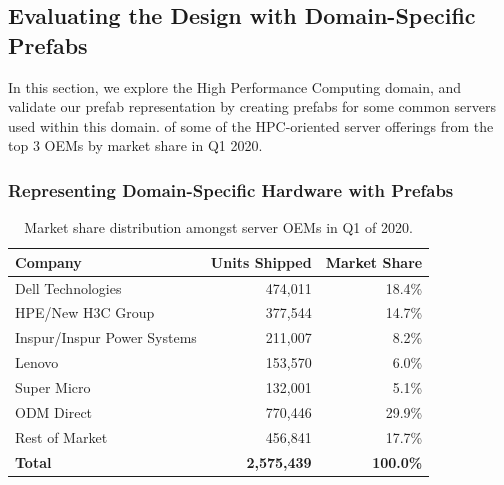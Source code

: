 \documentclass[11pt]{article}
\begin{document}
	\subsection{Evaluating the Design with Domain-Specific Prefabs}
		In this section, we explore the High Performance Computing domain, and validate our prefab representation by creating prefabs for some common servers used within this domain. of some of the HPC-oriented server offerings from the top 3 OEMs by market share in Q1 2020.
	
		\subsubsection{Representing Domain-Specific Hardware with Prefabs}
			\begin{table}[]
			\centering
				\begin{tabular}{lrr}
				\toprule
				Company                     & Units Shipped      & Market Share     \\ \midrule
				\rowcolor[HTML]{9AFF99} 
				Dell Technologies           & 474,011            & 18.4\%           \\
				\rowcolor[HTML]{9AFF99} 
				HPE/New H3C Group           & 377,544            & 14.7\%           \\
				\rowcolor[HTML]{9AFF99} 
				Inspur/Inspur Power Systems & 211,007            & 8.2\%            \\
				Lenovo                      & 153,570            & 6.0\%            \\
				Super Micro                 & 132,001            & 5.1\%            \\
				ODM Direct                  & 770,446            & 29.9\%           \\
				Rest of Market              & 456,841            & 17.7\%           \\ \midrule
				\textbf{Total}              & \textbf{2,575,439} & \textbf{100.0\%} \\ \bottomrule
				\end{tabular}
			\caption{Market share distribution amongst server OEMs in Q1 of 2020.}
			\label{tab:1}
			\end{table}
\end{document}
